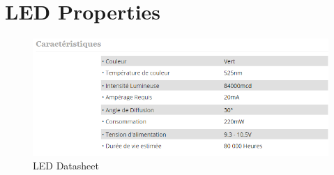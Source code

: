 \documentclass[12pt,a4paper,fleqn, onesside]{report}
\begin{document}




\appendix
{}
\section{LED Properties}
\label{LEDdatasheet}
\begin{figure}[h]
  \centerline{\includegraphics[scale=0.8]{fig/LedDataSheet.png}}
  \caption{LED Datasheet}
  \label{fig:LEDdatasheet}
\end{figure}
\end{document}
